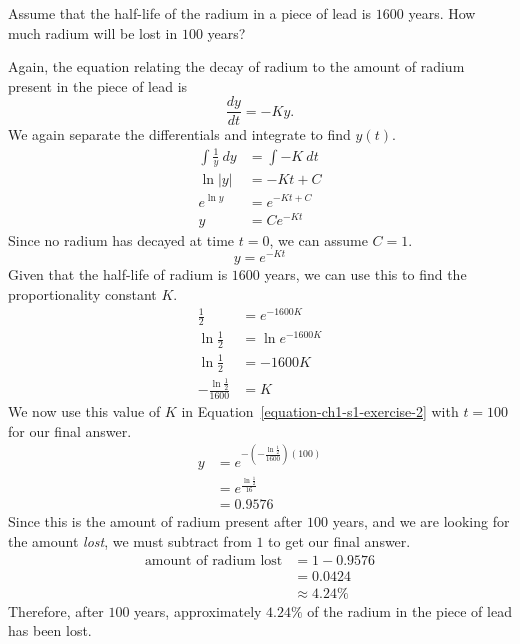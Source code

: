 \begin{exercise}
	Assume that the half-life of the radium in a piece of lead is $1600$ years. How much radium will be lost in $100$ years?
\end{exercise}
\begin{solution}
	Again, the equation relating the decay of radium to the amount of radium present in the piece of lead is
	\begin{equation*}
	\frac{dy}{dt} = -Ky.
	\end{equation*}
	We again separate the differentials and integrate to find $y\left(t\right)$.
	\begin{align*}
	\int \frac{1}{y} \  dy &= \int -K \ dt \\
	\ln \left| y \right| &= -Kt + C \\
	e^{\ln y} &= e^{-Kt + C} \\
	y &= Ce^{-Kt}
	\end{align*}
	Since no radium has decayed at time $t = 0$, we can assume $C = 1$.
	\begin{equation}
	\label{equation-ch1-s1-exercise-2}
	y = e^{-Kt}
	\end{equation}
	Given that the half-life of radium is $1600$ years, we can use this to find the proportionality constant $K$.
	\begin{align*}
	\frac{1}{2} &= e^{-1600K} \\
	\ln \frac{1}{2} &= \ln e^{-1600K} \\
	\ln \frac{1}{2} &= -1600K \\
	-\frac{\ln \frac{1}{2}}{1600} &= K
	\end{align*}
	We now use this value of $K$ in Equation~\ref{equation-ch1-s1-exercise-2} with $t = 100$ for our final answer.
	\begin{align*}
	y &= e^{-\left(-\frac{\ln \frac{1}{2}}{1600}\right)\left(100\right)} \\
	&= e^{\frac{\ln \frac{1}{2}}{16}} \\
	&= 0.9576
	\end{align*}
	Since this is the amount of radium present after $100$ years, and we are looking for the amount \textit{lost}, we must subtract from $1$ to get our final answer.
	\begin{align*}
	\text{amount of radium lost} &= 1 - 0.9576 \\
	&= 0.0424 \\
	&\approx 4.24\%
	\end{align*}
	Therefore, after $100$ years, approximately $4.24\%$ of the radium in the piece of lead has been lost.
\end{solution}
